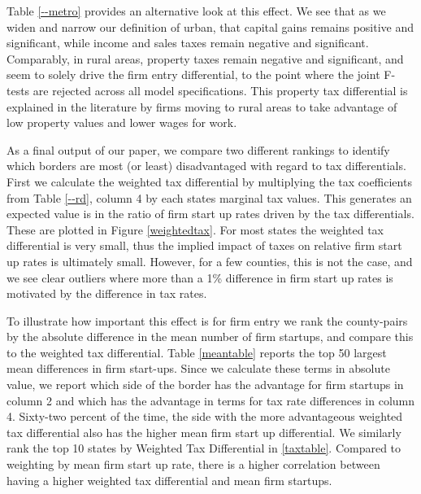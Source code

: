  Table \ref{--metro} provides an alternative look at this effect. We see that as we widen and narrow our definition of urban, that capital gains remains positive and significant, while income and sales taxes remain negative and significant. Comparably, in rural areas, property taxes remain negative and significant, and seem to solely drive the firm entry differential, to the point where the joint F-tests are rejected across all model specifications. This property tax differential is explained in the literature by firms moving to rural areas to take advantage of low property values and lower wages for work.
 
As a final output of our paper, we compare two different rankings to identify which borders are most (or least) disadvantaged with regard to tax differentials. First we calculate the weighted tax differential by multiplying the tax coefficients from Table \ref{--rd}, column 4 by each states marginal tax values. This generates an expected value is in the ratio of firm start up rates driven by the tax differentials.  These are plotted in Figure \ref{weightedtax}. For most states the weighted tax differential is very small, thus the implied impact of taxes on relative firm start up rates is ultimately small. However, for a few counties, this is not the case, and we see clear outliers where more than a 1\% difference in firm start up rates is motivated by the difference in tax rates. 

To illustrate how important this effect is for firm entry we rank the county-pairs by the absolute difference in the mean number of firm startups, and compare this to the weighted tax differential. Table \ref{meantable} reports the top 50 largest mean differences in firm start-ups.  Since we calculate these terms in absolute value, we report which side of the border has  the advantage for firm startups in column 2 and which has the advantage in terms for tax rate differences in column 4.  Sixty-two percent of the time, the side with the more advantageous weighted tax differential also has the higher mean firm start up differential. We similarly rank the top 10 states by Weighted Tax Differential in \ref{taxtable}. Compared to weighting by mean firm start up rate, there is a higher correlation between having a higher weighted tax differential and mean firm startups.